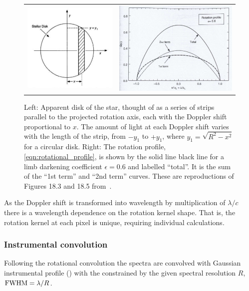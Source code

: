 \begin{figure}
    \centering
    \begin{tabular}{cc}
        \includegraphics[width=0.45\linewidth]{figures/information-content/rotation_diagram} & \includegraphics[width=0.45\linewidth]{figures/information-content/rotational_profile}\\
    \end{tabular}
    \caption{Left: Apparent disk of the star, thought of as a series of strips parallel to the projected rotation axis, each with the Doppler shift proportional to \(x\).
        The amount of light at each Doppler shift varies with the length of the strip, from \(-y_1\) to \(+y_1\), where \(y_1 = \sqrt{R^2-x^2}\) for a circular disk.
        Right: The rotation profile, \cref{eqn:rotational_profile}, is shown by the solid line black line for a limb darkening coefficient \(\epsilon=0.6\) and labelled ``total''.
        It is the sum of the ``1st term'' and ``2nd term'' curves.
        These are reproductions of Figures 18.3 and 18.5 from~\citep{gray_observation_2005}.}
    \label{fig:rotationdiagram_and_profile}
\end{figure}


As the Doppler shift \Vsini{} is transformed into wavelength by multiplication of $\lambda / c$ there is a wavelength dependence on the rotation kernel shape.
That is, the rotation kernel at each pixel is unique, requiring individual calculations.

\subsubsection*{Instrumental convolution}
\label{subsubsec:instrumental_convolution}
Following the rotational convolution the spectra are convolved with Gaussian instrumental profile ({\IP{}}) with the {\fwhm}  constrained by the given spectral resolution \(R\), $\textrm{FWHM}=\lambda/R$.

